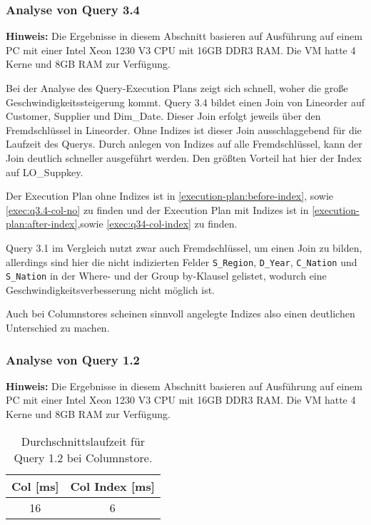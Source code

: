 \subsubsection{Analyse von Query 3.4}
\textbf{Hinweis:} Die Ergebnisse in diesem Abschnitt basieren auf Ausführung auf einem PC mit einer Intel Xeon 1230 V3 CPU mit 16GB DDR3 RAM. Die VM hatte 4 Kerne und 8GB RAM zur Verfügung.

Bei der Analyse des Query-Execution Plans zeigt sich schnell,
woher die große Geschwindigkeitssteigerung kommt.
Query 3.4 bildet einen Join von Lineorder auf Customer,
Supplier und Dim\_Date. 
Dieser Join erfolgt jeweils über den Fremdschlüssel in Lineorder.
Ohne Indizes ist dieser Join ausschlaggebend für die Laufzeit des Querys.
Durch anlegen von Indizes auf alle Fremdschlüssel,
kann der Join deutlich schneller ausgeführt werden.
Den größten Vorteil hat hier der Index auf LO\_Suppkey.

Der Execution Plan ohne Indizes ist in \autoref{execution-plan:before-index}, sowie \autoref{exec:q3.4-col-no}
zu finden und der Execution Plan mit Indizes ist in \autoref{execution-plan:after-index},sowie \autoref{exec:q34-col-index} zu finden.

Query 3.1 im Vergleich nutzt zwar auch Fremdschlüssel, um einen Join zu bilden,
allerdings sind hier die nicht indizierten Felder \verb+S_Region+, \verb+D_Year+,
\verb+C_Nation+ und \verb+S_Nation+ in der Where- und der Group by-Klausel gelistet,
wodurch eine Geschwindigkeitsverbesserung nicht möglich ist.

Auch bei Columnstores scheinen sinnvoll angelegte Indizes also einen deutlichen Unterschied zu machen.

\subsubsection{Analyse von Query 1.2}
\textbf{Hinweis:} Die Ergebnisse in diesem Abschnitt basieren auf Ausführung auf einem PC mit einer Intel Xeon 1230 V3 CPU mit 16GB DDR3 RAM. Die VM hatte 4 Kerne und 8GB RAM zur Verfügung.






\setlength\intextsep{0pt}
\begin{wraptable}{r}{0.5\textwidth}
    \centering
    \begin{tabular}{cc}
        Col [ms]       & Col Index [ms]    \\
        \toprule
         16          & 6         \\   
    \end{tabular}
	\caption{Durchschnittslaufzeit für Query 1.2 bei Columnstore.}
    \label{tab:olap_q12}
\end{wraptable}


